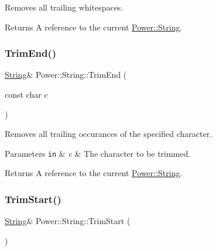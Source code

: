 Removes all trailing whitespaces. 

\begin{DoxyReturn}{Returns}
A reference to the current \hyperlink{class_power_1_1_string}{Power\+::\+String}. 
\end{DoxyReturn}
\mbox{\label{class_power_1_1_string_a7d7f493bed421a3919144c66fcb38121}} 
\subsubsection{\texorpdfstring{Trim\+End()}{TrimEnd()}\hspace{0.1cm}{\footnotesize\ttfamily [2/2]}}
{\footnotesize\ttfamily \hyperlink{class_power_1_1_string}{String}\& Power\+::\+String\+::\+Trim\+End (\begin{DoxyParamCaption}\item[{const char}]{c }\end{DoxyParamCaption})\hspace{0.3cm}{\ttfamily [inline]}}



Removes all trailing occurances of the specified character. 


\begin{DoxyParams}[1]{Parameters}
\mbox{\tt in}  & {\em c} & The character to be trimmed. \\
\hline
\end{DoxyParams}
\begin{DoxyReturn}{Returns}
A reference to the current \hyperlink{class_power_1_1_string}{Power\+::\+String}. 
\end{DoxyReturn}
\mbox{\label{class_power_1_1_string_a7c1c035836c4c42b4d6a118b7035742e}} 
\subsubsection{\texorpdfstring{Trim\+Start()}{TrimStart()}\hspace{0.1cm}{\footnotesize\ttfamily [1/2]}}
{\footnotesize\ttfamily \hyperlink{class_power_1_1_string}{String}\& Power\+::\+String\+::\+Trim\+Start (\begin{DoxyParamCaption}{ }\end{DoxyParamCaption})\hspace{0.3cm}{\ttfamily [inline]}}




